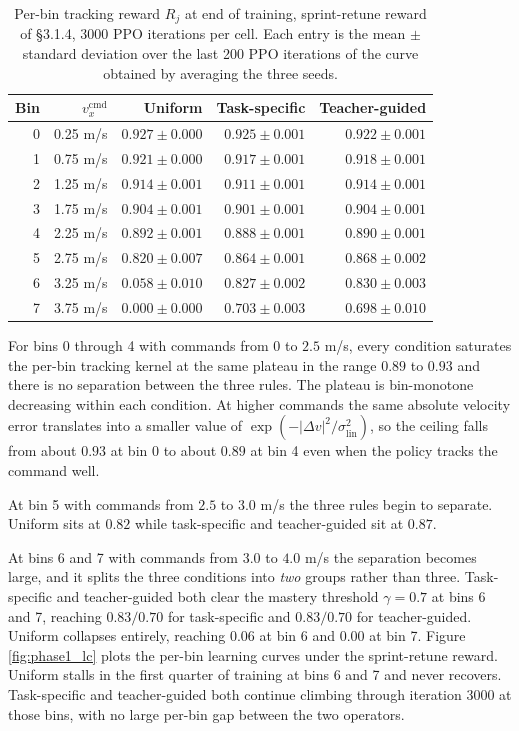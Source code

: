 \begin{table}[ht]
\centering
\begin{tabularx}{\textwidth}{@{}r r r r r@{}}
\toprule
\textbf{Bin} & $v_x^{\mathrm{cmd}}$ & \textbf{Uniform} & \textbf{Task-specific} & \textbf{Teacher-guided} \\
\midrule
0 & 0.25 m/s & $0.927 \pm 0.000$ & $0.925 \pm 0.001$ & $0.922 \pm 0.001$ \\
1 & 0.75 m/s & $0.921 \pm 0.000$ & $0.917 \pm 0.001$ & $0.918 \pm 0.001$ \\
2 & 1.25 m/s & $0.914 \pm 0.001$ & $0.911 \pm 0.001$ & $0.914 \pm 0.001$ \\
3 & 1.75 m/s & $0.904 \pm 0.001$ & $0.901 \pm 0.001$ & $0.904 \pm 0.001$ \\
4 & 2.25 m/s & $0.892 \pm 0.001$ & $0.888 \pm 0.001$ & $0.890 \pm 0.001$ \\
5 & 2.75 m/s & $0.820 \pm 0.007$ & $0.864 \pm 0.001$ & $0.868 \pm 0.002$ \\
6 & 3.25 m/s & $0.058 \pm 0.010$ & $0.827 \pm 0.002$ & $0.830 \pm 0.003$ \\
7 & 3.75 m/s & $0.000 \pm 0.000$ & $0.703 \pm 0.003$ & $0.698 \pm 0.010$ \\
\bottomrule
\end{tabularx}
\caption{Per-bin tracking reward $R_j$ at end of training, sprint-retune reward of \S3.1.4, 3000 PPO iterations per cell. Each entry is the mean $\pm$ standard deviation over the last 200 PPO iterations of the curve obtained by averaging the three seeds.}
\label{tab:phase1_rlin}
\end{table}

For bins 0 through 4 with commands from $0$ to $2.5$ m/s, every condition saturates the per-bin tracking kernel at the same plateau in the range $0.89$ to $0.93$ and there is no separation between the three rules. The plateau is bin-monotone decreasing within each condition. At higher commands the same absolute velocity error translates into a smaller value of $\exp(-|\Delta v|^2/\sigma_{\mathrm{lin}}^2)$, so the ceiling falls from about $0.93$ at bin 0 to about $0.89$ at bin 4 even when the policy tracks the command well.

At bin 5 with commands from $2.5$ to $3.0$ m/s the three rules begin to separate. Uniform sits at $0.82$ while task-specific and teacher-guided sit at $0.87$.

At bins 6 and 7 with commands from $3.0$ to $4.0$ m/s the separation becomes large, and it splits the three conditions into \textit{two} groups rather than three. Task-specific and teacher-guided both clear the mastery threshold $\gamma = 0.7$ at bins 6 and 7, reaching $0.83 / 0.70$ for task-specific and $0.83 / 0.70$ for teacher-guided. Uniform collapses entirely, reaching $0.06$ at bin 6 and $0.00$ at bin 7. Figure \ref{fig:phase1_lc} plots the per-bin learning curves under the sprint-retune reward. Uniform stalls in the first quarter of training at bins 6 and 7 and never recovers. Task-specific and teacher-guided both continue climbing through iteration 3000 at those bins, with no large per-bin gap between the two operators.

